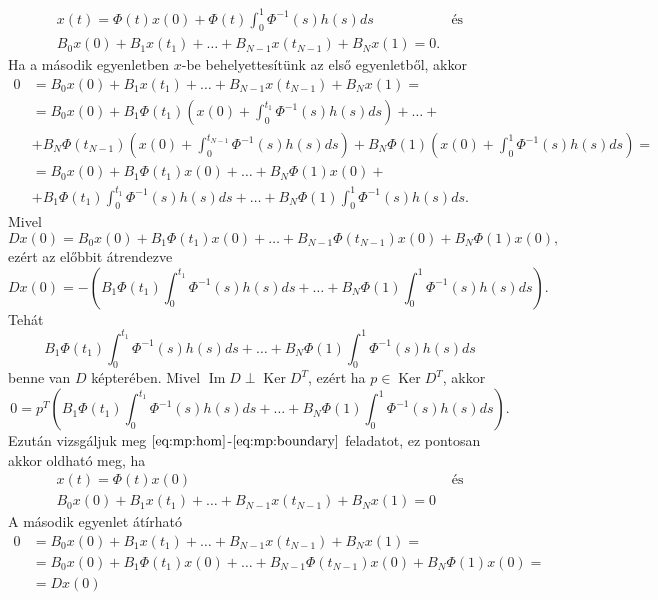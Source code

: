 \documentclass[oneside, titlepage, 12pt, a4paper]{report}
\DeclareMathOperator{\Ima}{Im}	%
\DeclareMathOperator{\Ker}{Ker}	%
\begin{document}
\begin{align*}
&x(t) = \Phi(t) x(0) + \Phi(t) \int_0^1 \Phi^{-1}(s) h(s) ds &\text{és}& \\
&B_0 x(0) + B_1 x(t_1) + \dots + B_{N-1} x(t_{N-1}) + B_N x(1) = 0.&&
\end{align*}
Ha a második egyenletben $x$-be behelyettesítünk az első egyenletből, akkor
\begin{align*}
0 &= B_0 x(0) + B_1 x(t_1) + \dots + B_{N-1} x(t_{N-1}) + B_N x(1) = \\
 &= B_0 x(0) + B_1 \Phi(t_1) \left( x(0) + \int_0^{t_1} \Phi^{-1}(s) h(s) ds \right) + \dots + \\
 &+ B_N \Phi(t_{N-1}) \left( x(0) + \int_0^{t_{N-1}} \Phi^{-1}(s) h(s) ds \right) +  B_N \Phi(1) \left( x(0) + \int_0^1 \Phi^{-1}(s) h(s) ds \right) = \\
 &= B_0 x(0) + B_1 \Phi(t_1) x(0) + \dots + B_N \Phi(1) x(0) + \\
 &+ B_1 \Phi(t_1) \int_0^{t_1} \Phi^{-1}(s) h(s) ds + \dots + B_N \Phi(1) \int_0^1 \Phi^{-1}(s) h(s) ds.
\end{align*}
Mivel
\begin{equation*}
D x(0) = B_0 x(0) + B_1 \Phi(t_1) x(0) + \dots + B_{N-1} \Phi(t_{N-1}) x(0) + B_N \Phi(1) x(0),
\end{equation*}
ezért az előbbit átrendezve
\begin{equation*}
D x(0) = - \left( B_1 \Phi(t_1) \int_0^{t_1} \Phi^{-1}(s) h(s) ds + \dots + B_N \Phi(1) \int_0^1 \Phi^{-1}(s) h(s) ds \right).
\end{equation*}
Tehát
\begin{equation*}
B_1 \Phi(t_1) \int_0^{t_1} \Phi^{-1}(s) h(s) ds + \dots + B_N \Phi(1) \int_0^1 \Phi^{-1}(s) h(s) ds
\end{equation*}
benne van $D$ képterében. Mivel $\Ima D \perp \Ker D^T$, ezért ha $p \in \Ker D^T$, akkor
\begin{equation*}
0 = p^T \left( B_1 \Phi(t_1) \int_0^{t_1} \Phi^{-1}(s) h(s) ds + \dots + B_N \Phi(1) \int_0^1 \Phi^{-1}(s) h(s) ds \right).
\end{equation*}
Ezután vizsgáljuk meg $\eqref{eq:mp:hom}$-$\eqref{eq:mp:boundary}$ feladatot, ez pontosan akkor oldható meg, ha
\begin{align*}
&x(t) = \Phi(t) x(0) &\text{ és}& \\
&B_0 x(0) + B_1 x(t_1) + \dots + B_{N-1} x(t_{N-1}) + B_N x(1) = 0&&
\end{align*}
A második egyenlet átírható
\begin{align*}
0 &= B_0 x(0) + B_1 x(t_1) + \dots + B_{N-1} x(t_{N-1}) + B_N x(1) = \\
 &= B_0 x(0) + B_1 \Phi(t_1) x(0) + \dots + B_{N-1} \Phi(t_{N-1}) x(0) + B_N \Phi(1) x(0) = \\
 &= D x(0)
\end{align*}
\end{document}
